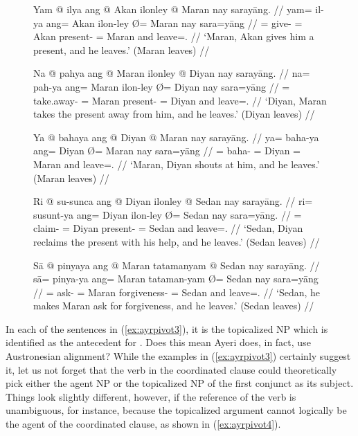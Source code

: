 \begin{figure}
\pex\label{ex:ayrpivot3}
\a\label{ex:ayrpivot3_dat}\begingl
	\gla Yam @ ilya ang @ Akan ilonley {} @ Maran nay sarayāng. //
	\glb yam= il-ya ang= Akan ilon-ley Ø= Maran nay sara=yāng //
	\glc \DatT{}= give-\TsgM{} \Aarg{}= Akan present-\PargI{} \Top{}= Maran
		and leave=\TsgM{}.\Aarg{} //
	\glft `Maran, Akan gives him a present, and he leaves.' (Maran leaves) //
\endgl

\a\label{ex:ayrpivot3_gen}\begingl
	\gla Na @ pahya ang @ Maran ilonley {} @ Diyan nay sarayāng. //
	\glb na= pah-ya ang= Maran ilon-ley Ø= Diyan nay sara=yāng //
	\glc \GenT{}= take.away-\TsgM{} \Aarg{}= Maran present-\PargI{} \Top{}=
		Diyan and leave=\TsgM{}.\Aarg{} //
	\glft `Diyan, Maran takes the present away from him, and he leaves.' (Diyan
		leaves) //
\endgl

\a\label{ex:ayrpivot3_loc}\begingl
	\gla Ya @ bahaya ang @ Diyan {} @ Maran nay sarayāng. //
	\glb ya= baha-ya ang= Diyan Ø= Maran nay sara=yāng //
	\glc \LocT{}= baha-\TsgM{} \Aarg{}= Diyan \Top{}= Maran and 
		leave=\TsgM{}.\Aarg{} //
	\glft `Maran, Diyan shouts at him, and he leaves.' (Maran leaves) //
\endgl

\a\label{ex:ayrpivot3_ins}\begingl
	\gla Ri @ su-sunca ang @ Diyan ilonley {} @ Sedan nay sarayāng. //
	\glb ri= su\til{}sunt-ya ang= Diyan ilon-ley Ø= Sedan nay sara=yāng. //
	\glc \InsT{}= \Iter{}\til{}claim-\TsgM{} \Aarg{}= Diyan present-\PargI{}
		\Top{}= Sedan and leave=\TsgM{}.\Aarg{} //
	\glft `Sedan, Diyan reclaims the present with his help, and he leaves.'
		(Sedan leaves) //
\endgl

\a\label{ex:ayrpivot3_cau}\begingl
	\gla Sā @ pinyaya ang @ Maran tatamanyam {} @ Sedan nay sarayāng. //
	\glb sā= pinya-ya ang= Maran tataman-yam Ø= Sedan nay sara=yāng //
	\glc \CauT{}= ask-\TsgM{} \Aarg{}= Maran forgiveness-\Dat{} \Top{}= Sedan
		and leave=\TsgM{}.\Aarg{} //
	\glft `Sedan, he makes Maran ask for forgiveness, and he leaves.' (Sedan
		leaves) //
\endgl

\xe
\end{figure}

In each of the sentences in (\ref{ex:ayrpivot3}), it is the topicalized NP
which is identified as the antecedent for .
Does this mean Ayeri does, in fact, use Austronesian alignment? While the
examples in (\ref{ex:ayrpivot3}) certainly suggest it, let us not forget that
the verb in the coordinated clause could theoretically pick either the agent NP
or the topicalized NP of the first conjunct as its subject. Things look
slightly different, however, if the reference of the verb is unambiguous, for
instance, because the topicalized argument cannot logically be the agent of the
coordinated clause, as shown in (\ref{ex:ayrpivot4}).

